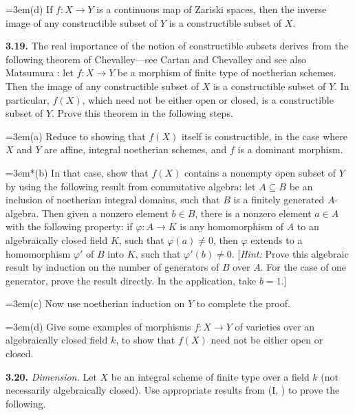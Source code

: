 {\noindent\hangindent=3em\hspace*{1.7em}(d) If $f\colon X\to Y$ is a continuous map of Zariski spaces, then the inverse image of any constructible subset of $Y$ is a constructible subset of $X$.

\smallskip
\noindent\hypertarget{ex-II-3.19}{}\textbf{3.19.} The real importance of the notion of constructible subsets derives from the following theorem of Chevalley---see Cartan and Chevalley  and see also Matsumura : let $f\colon X\to Y$ be a morphism of finite type of noetherian schemes. Then the image of any constructible subset of $X$ is a constructible subset of $Y$. In particular, $f(X)$, which need not be either open or closed, is a constructible subset of $Y$. Prove this theorem in the following steps.

\noindent\hangindent=3em\hspace*{1.7em}(a) Reduce to showing that $f(X)$ itself is constructible, in the case where $X$ and $Y$ are affine, integral noetherian schemes, and $f$ is a dominant morphism.

\noindent\hangindent=3em\hspace*{1.4em}*(b) In that case, show that $f(X)$ contains a nonempty open subset of $Y$ by using the following result from commutative algebra: let $A\subseteq B$ be an inclusion of noetherian integral domains, such that $B$ is a finitely generated $A$-algebra. Then given a nonzero element $b\in B$, there is a nonzero element $a\in A$ with the following property: if $\varphi\colon A\to K$ is any homomorphism of $A$ to an algebraically closed field $K$, such that $\varphi(a)\ne 0$, then $\varphi$ extends to a homomorphism $\varphi'$ of $B$ into $K$, such that $\varphi'(b)\ne 0$. [\emph{Hint:} Prove this algebraic result by induction on the number of generators of $B$ over $A$. For the case of one generator, prove the result directly. In the application, take $b=1$.]

\noindent\hangindent=3em\hspace*{1.7em}(c) Now use noetherian induction on $Y$ to complete the proof.

\noindent\hangindent=3em\hspace*{1.7em}(d) Give some examples of morphisms $f\colon X\to Y$ of varieties over an algebraically closed field $k$, to show that $f(X)$ need not be either open or closed.

\smallskip
\noindent\hypertarget{ex-II-3.20}{}\textbf{3.20.} \emph{Dimension.} Let $X$ be an integral scheme of finite type over a field $k$ (not necessarily algebraically closed). Use appropriate results from (I, ) to prove the following.}

